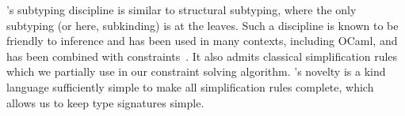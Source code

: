 \lang's  subtyping discipline is similar
to structural subtyping, where the only subtyping (or here, subkinding)
is at the leaves.
Such a discipline is known to be friendly to inference and has been used in many
contexts, including OCaml, and has been combined
with constraints~\citep{DBLP:journals/tapos/OderskySW99,DBLP:conf/sas/TrifonovS96}.
It also admits classical simplification rules
\citep{DBLP:conf/aplas/Simonet03,DBLP:conf/popl/PottierS02} which we partially use
in our constraint solving algorithm.
\affe's novelty is a kind language
sufficiently simple to make
all simplification rules complete, which allows us to keep type signatures simple.


